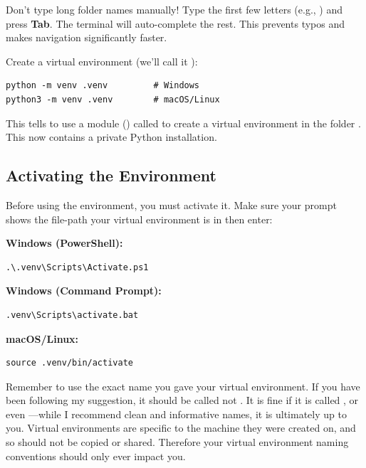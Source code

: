 \begin{tip}
Don't type long folder names manually! Type the first few letters (e.g., ) and press \textbf{Tab}. The terminal will auto-complete the rest. This prevents typos and makes navigation significantly faster.
\end{tip}

Create a virtual environment (we'll call it ):

\begin{lstlisting}[style=shellstyle]
python -m venv .venv         # Windows
python3 -m venv .venv        # macOS/Linux
\end{lstlisting}

This tells  to use a module () called  to create a virtual environment in the folder . This now contains a private Python installation.

\subsection{Activating the Environment}

Before using the environment, you must activate it. Make sure your prompt shows the file-path your virtual environment is in then enter:

\begin{osbox}
\textbf{Windows (PowerShell):}
\begin{lstlisting}[style=shellstyle]
.\.venv\Scripts\Activate.ps1
\end{lstlisting}

\textbf{Windows (Command Prompt):}
\begin{lstlisting}[style=shellstyle]
.venv\Scripts\activate.bat
\end{lstlisting}

\textbf{macOS/Linux:}
\begin{lstlisting}[style=shellstyle]
source .venv/bin/activate
\end{lstlisting}
\end{osbox}

Remember to use the exact name you gave your virtual environment. If you have been following my suggestion, it should be called  not . It is fine if it is called , or even ---while I recommend clean and informative names, it is ultimately up to you. Virtual environments are specific to the machine they were created on, and so should not be copied or shared. Therefore your virtual environment naming conventions should only ever impact you.

